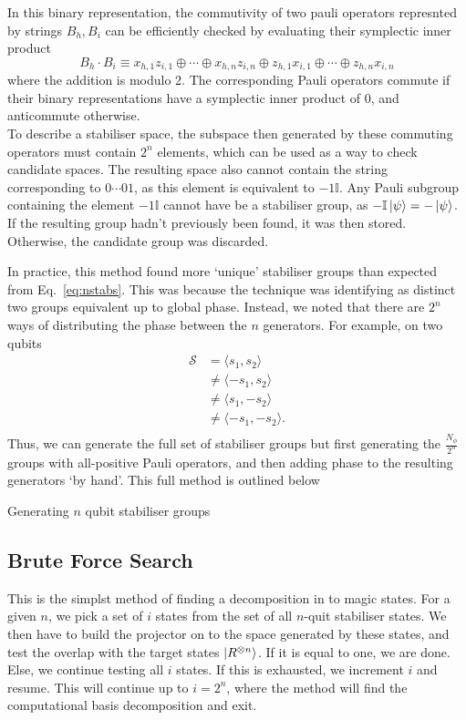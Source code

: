\documentclass{standalone}
\begin{document}
In this binary representation, the commutivity of two pauli operators represnted by strings $B_{h},B_{i}$ can be efficiently checked by evaluating their symplectic inner product
\begin{equation}\label{eq:sympprod}
    B_{h}\cdot B_{i} \equiv x_{h,1}z_{i,1}\oplus\cdots\oplus x_{h,n}z_{i,n}\oplus z_{h,1}x_{i,1}\oplus\cdots\oplus z_{h,n}x_{i,n}
\end{equation}
where the addition is modulo 2. The corresponding Pauli operators commute if their binary representations have a symplectic inner product of $0$, and anticommute otherwise.\\
To describe a stabiliser space, the subspace then generated by these commuting operators must contain $2^{n}$ elements, which can be used as a way to check candidate spaces. The resulting space also cannot contain the string corresponding to $0\cdots01$, as this element is equivalent to $-1\mathbb{I}$. Any Pauli subgroup containing the element $-1\mathbb{I}$ cannot have be a stabiliser group, as $-\mathbb{I}\ket{\psi}=-\ket{\psi}$. \\
If the resulting group hadn't previously been found, it was then stored. Otherwise, the candidate group was discarded.
\par
In practice, this method found more `unique' stabiliser groups than expected from Eq.~\ref{eq:nstabs}. This was because the technique was identifying as distinct two groups equivalent up to global phase. Instead, we noted that there are $2^{n}$ ways of distributing the phase between the $n$ generators. For example, on two qubits
\begin{align*}
    \mathcal{S}&=\langle s_{1},s_{2}\rangle \\
    &\neq \langle -s_{1},s_{2}\rangle \\
    &\neq \langle s_{1},-s_{2}\rangle \\
    &\neq \langle -s_{1},-s_{2}\rangle. \\
\end{align*}
Thus, we can generate the full set of stabiliser groups but first generating the $\frac{N_{\phi}}{2^{n}}$ groups with all-positive Pauli operators, and then adding phase to the resulting generators `by hand'. This full method is outlined below
\begin{algorithm}
\caption{Generating $n$ qubit stabiliser groups}
\begin{algorithmic}
\end{algorithmic}
\end{algorithm}
\subsection{Brute Force Search}
This is the simplst method of finding a decomposition in to magic states. For a given $n$, we pick a set of $i$ states from the set of all $n$-quit stabiliser states. We then have to build the projector on to the space generated by these states, and test the overlap with the target states $\ket{R^{\otimes n}}$. If it is equal to one, we are done. Else, we continue testing all $i$ states. If this is exhausted, we increment $i$ and resume. This will continue up to $i=2^{n}$, where the method will find the computational basis decomposition and exit. 
\end{document}
